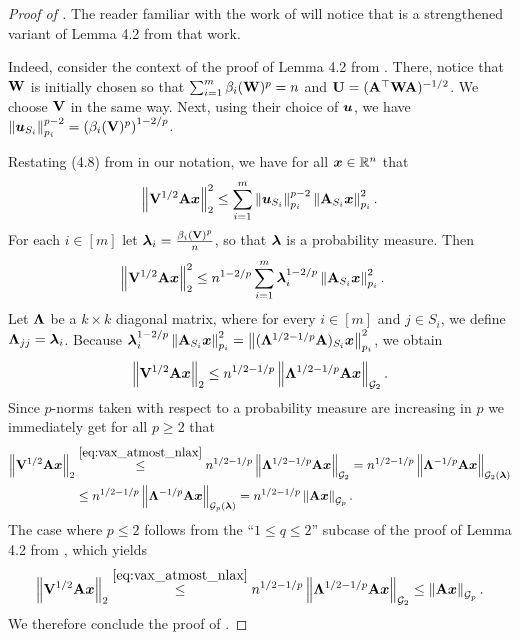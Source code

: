 \documentclass[11pt]{article}
\numberwithin{equation}{section}
\begin{document}
\begin{proof}[Proof of ]
The reader familiar with the work of \citet{jlls23} will notice that  is a strengthened variant of Lemma 4.2 from that work. 

Indeed, consider the context of the proof of Lemma 4.2 from \cite{jlls23}. There, notice that $\mathbf{W}$ is initially chosen so that $\sum_{i=1}^m \beta_i(\mathbf{W})^p = n$ and \(\mathbf{U} = (\mathbf{A}^\top \mathbf{W} \mathbf{A})^{-1/2}\). We choose $\mathbf{V}$ in the same way. Next, using their choice of $\bm{u}$, we have $\left\lVert \bm{u}_{S_i} \right\rVert_{p_i}^{p-2} = \left(\beta_i(\mathbf{V})^{p}\right)^{1-2/p}$. 

Restating (4.8) from \cite{jlls23} in our notation, we have for all $\bm{x}\in\mathbb{R}^n$ that
\begin{align*}
    \left\lVert \mathbf{V}^{1/2} \mathbf{A} \bm{x} \right\rVert_2^2 \le \sum_{i=1}^m \left\lVert \bm{u}_{S_i} \right\rVert_{p_i}^{p-2} \left\lVert \mathbf{A}_{S_i} \bm{x} \right\rVert_{p_i}^2.
\end{align*}
For each \(i \in [m]\) let \(\bm{\lambda}_i = \frac{\beta_i(\mathbf{V})^p}{n}\), so that \(\bm{\lambda}\) is a probability measure.
Then
\begin{align*}
    \left\lVert \mathbf{V}^{1/2} \mathbf{A} \bm{x} \right\rVert_2^2 &\le n^{1-2/p} \sum_{i=1}^m \bm{\lambda}_i^{1-2/p} \left\lVert \mathbf{A}_{S_i} \bm{x} \right\rVert_{p_i}^2.
\end{align*}
Let \(\mathbf{\Lambda}\) be a \(k \times k\) diagonal matrix, where for every \(i \in [m]\) and \(j \in S_i\),
we define \(\mathbf{\Lambda}_{jj} = \bm{\lambda}_i\).
Because \(\bm{\lambda}_i^{1-2/p} \left\lVert \mathbf{A}_{S_i} \bm{x} \right\rVert_{p_i}^2 = \left\lVert (\mathbf{\Lambda}^{1/2-1/p} \mathbf{A})_{S_i} \bm{x} \right\rVert_{p_i}^2\), we obtain
\begin{equation}\label{eq:vax_atmost_nlax}
    \left\lVert \mathbf{V}^{1/2}\mathbf{A}\bm{x} \right\rVert_2 \le n^{1/2-1/p}\left\lVert \mathbf{\Lambda}^{1/2-1/p}\mathbf{A}\bm{x} \right\rVert_{\mathcal{G}_{2}}.
\end{equation}
Since $p$-norms taken with respect to a probability measure are increasing in $p$ we immediately get for all $p \ge 2$ that
\begin{align*}
    \left\lVert \mathbf{V}^{1/2}\mathbf{A}\bm{x} \right\rVert_2 &\stackrel{\eqref{eq:vax_atmost_nlax}}{\le} n^{1/2-1/p}\left\lVert \mathbf{\Lambda}^{1/2-1/p}\mathbf{A}\bm{x} \right\rVert_{\mathcal{G}_{2}} = n^{1/2-1/p}\left\lVert \mathbf{\Lambda}^{-1/p}\mathbf{A}\bm{x} \right\rVert_{\mathcal{G}_{2}(\bm{\lambda})} \\
    &\le n^{1/2-1/p}\left\lVert \mathbf{\Lambda}^{-1/p}\mathbf{A}\bm{x} \right\rVert_{\mathcal{G}_{p}(\bm{\lambda})} = n^{1/2-1/p}\left\lVert \mathbf{A}\bm{x} \right\rVert_{\mathcal{G}_{p}}.
\end{align*}
The case where $p \le 2$ follows from the ``$1 \le q \le 2$'' subcase of the proof of Lemma 4.2 from \cite{jlls23}, which yields
\begin{align*}
    \left\lVert \mathbf{V}^{1/2}\mathbf{A}\bm{x} \right\rVert_2 \stackrel{\eqref{eq:vax_atmost_nlax}}{\le} n^{1/2-1/p}\left\lVert \mathbf{\Lambda}^{1/2-1/p}\mathbf{A}\bm{x} \right\rVert_{\mathcal{G}_{2}} \le \left\lVert \mathbf{A}\bm{x} \right\rVert_{\mathcal{G}_{p}}.
\end{align*}
We therefore conclude the proof of .
\end{proof}
\end{document}
